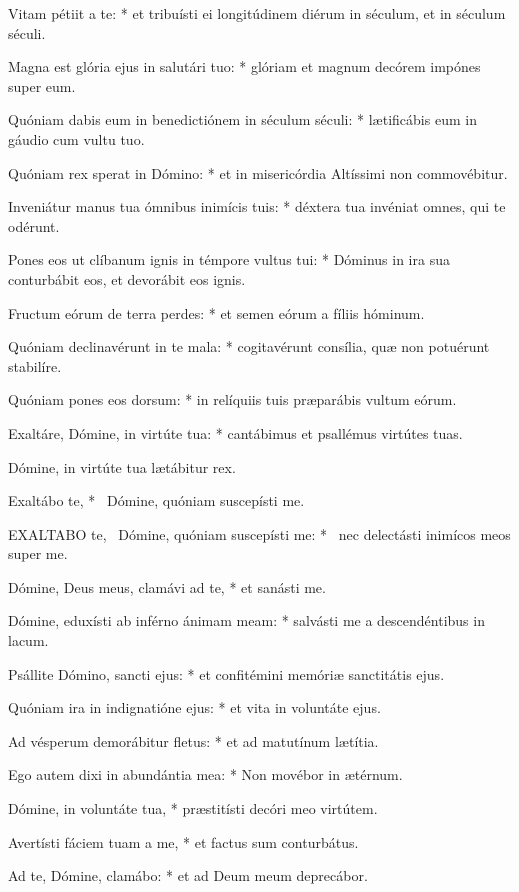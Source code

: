 Vitam pétiit a te: * et tribuísti ei longitúdinem diérum in séculum, et in séculum séculi.

Magna est glória ejus in salutári tuo: * glóriam et magnum decórem impónes super eum.

Quóniam dabis eum in benedictiónem in séculum séculi: * lætificábis eum in gáudio cum vultu tuo.

Quóniam rex sperat in Dómino: * et in misericórdia Altíssimi non commovébitur.

Inveniátur manus tua ómnibus inimícis tuis: * déxtera tua invéniat omnes, qui te odérunt.

Pones eos ut clíbanum ignis in témpore vultus tui: * Dóminus in ira sua conturbábit eos, et devorábit eos ignis.

Fructum eórum de terra perdes: * et semen eórum a fíliis hóminum.

Quóniam declinavérunt in te mala: * cogitavérunt consília, quæ non potuérunt stabilíre.

Quóniam pones eos dorsum: * in relíquiis tuis præparábis vultum eórum.

Exaltáre, Dómine, in virtúte tua: * cantábimus et psallémus virtútes tuas.

 Dómine, in virtúte tua lætábitur rex.

 Exaltábo te, * \textdagger\ Dómine, quóniam suscepísti me. \textdaggerdbl


\lettrine[lines=2]{E}{XALTABO} te, \textdagger\ Dómine, quóniam suscepísti me: * \textdaggerdbl\ nec delectásti inimícos meos super me.

Dómine, Deus meus, clamávi ad te, * et sanásti me.

Dómine, eduxísti ab inférno ánimam meam: * salvásti me a descendéntibus in lacum.

Psállite Dómino, sancti ejus: * et confitémini memóriæ sanctitátis ejus.

Quóniam ira in indignatióne ejus: * et vita in voluntáte ejus.

Ad vésperum demorábitur fletus: * et ad matutínum lætítia.

Ego autem dixi in abundántia mea: * Non movébor in ætérnum.

Dómine, in voluntáte tua, * præstitísti decóri meo virtútem.

Avertísti fáciem tuam a me, * et factus sum conturbátus.

Ad te, Dómine, clamábo: * et ad Deum meum deprecábor.

